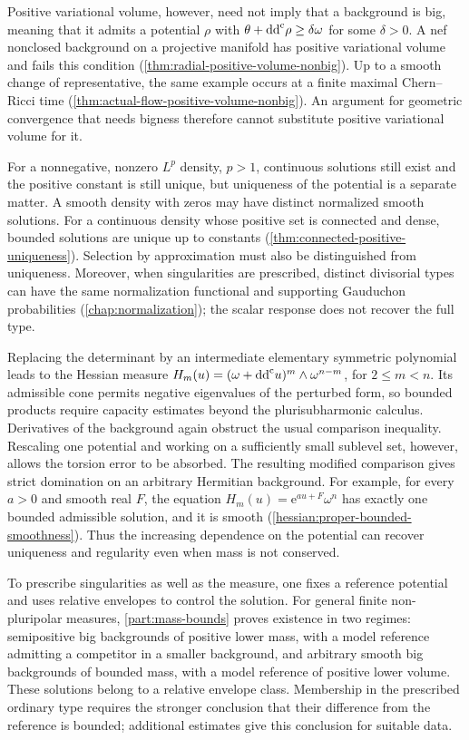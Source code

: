 Positive variational volume, however, need not imply that a background is big, meaning that it admits a potential $\rho$ with $\theta+\mathrm{dd}^{\mathrm{c}}\rho\geq\delta\omega$ for some $\delta>0$. A nef nonclosed background on a projective manifold has positive variational volume and fails this condition (\cref{thm:radial-positive-volume-nonbig}). Up to a smooth change of representative, the same example occurs at a finite maximal Chern--Ricci time (\cref{thm:actual-flow-positive-volume-nonbig}). An argument for geometric convergence that needs bigness therefore cannot substitute positive variational volume for it.

For a nonnegative, nonzero $L^p$ density, $p>1$, continuous solutions still exist and the positive constant is still unique, but uniqueness of the potential is a separate matter. A smooth density with zeros may have distinct normalized smooth solutions. For a continuous density whose positive set is connected and dense, bounded solutions are unique up to constants (\cref{thm:connected-positive-uniqueness}). Selection by approximation must also be distinguished from uniqueness. Moreover, when singularities are prescribed, distinct divisorial types can have the same normalization functional and supporting Gauduchon probabilities (\cref{chap:normalization}); the scalar response does not recover the full type.

Replacing the determinant by an intermediate elementary symmetric polynomial leads to the Hessian measure $H_m(u)=(\omega+\mathrm{dd}^{\mathrm{c}} u)^m\wedge\omega^{n-m}$, for $2\leq m<n$. Its admissible cone permits negative eigenvalues of the perturbed form, so bounded products require capacity estimates beyond the plurisubharmonic calculus. Derivatives of the background again obstruct the usual comparison inequality. Rescaling one potential and working on a sufficiently small sublevel set, however, allows the torsion error to be absorbed. The resulting modified comparison gives strict domination on an arbitrary Hermitian background. For example, for every $a>0$ and smooth real $F$, the equation $H_m(u)=\mathrm e^{au+F}\omega^n$ has exactly one bounded admissible solution, and it is smooth (\cref{hessian:proper-bounded-smoothness}). Thus the increasing dependence on the potential can recover uniqueness and regularity even when mass is not conserved.

To prescribe singularities as well as the measure, one fixes a reference potential and uses relative envelopes to control the solution. For general finite non-pluripolar measures, \cref{part:mass-bounds} proves existence in two regimes: semipositive big backgrounds of positive lower mass, with a model reference admitting a competitor in a smaller background, and arbitrary smooth big backgrounds of bounded mass, with a model reference of positive lower volume. These solutions belong to a relative envelope class. Membership in the prescribed ordinary type requires the stronger conclusion that their difference from the reference is bounded; additional estimates give this conclusion for suitable data.

